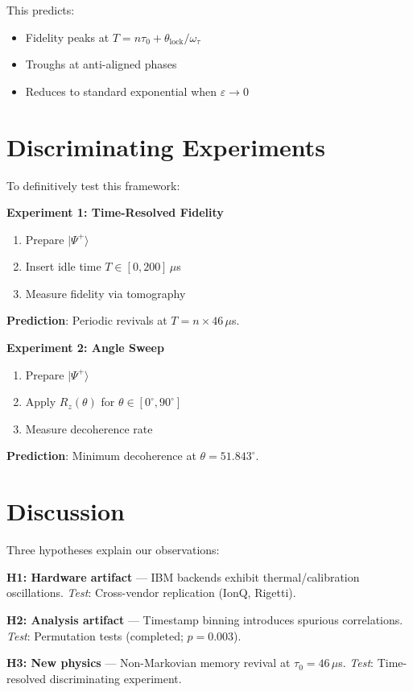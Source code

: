 \documentclass[twocolumn,prl,superscriptaddress,floatfix]{revtex4-2}
\begin{document}
This predicts:
\begin{itemize}
\item Fidelity peaks at $T = n\tau_0 + \theta_{\text{lock}}/\omega_\tau$
\item Troughs at anti-aligned phases
\item Reduces to standard exponential when $\varepsilon \to 0$
\end{itemize}

\section{Discriminating Experiments}

To definitively test this framework:

\textbf{Experiment 1: Time-Resolved Fidelity}
\begin{enumerate}
\item Prepare $|\Psi^+\rangle$
\item Insert idle time $T \in [0, 200]\,\mu$s
\item Measure fidelity via tomography
\end{enumerate}

\textbf{Prediction}: Periodic revivals at $T = n \times 46\,\mu$s.

\textbf{Experiment 2: Angle Sweep}
\begin{enumerate}
\item Prepare $|\Psi^+\rangle$
\item Apply $R_z(\theta)$ for $\theta \in [0^\circ, 90^\circ]$
\item Measure decoherence rate
\end{enumerate}

\textbf{Prediction}: Minimum decoherence at $\theta = 51.843^\circ$.

\section{Discussion}

Three hypotheses explain our observations:

\textbf{H1: Hardware artifact} --- IBM backends exhibit thermal/calibration oscillations. \emph{Test}: Cross-vendor replication (IonQ, Rigetti).

\textbf{H2: Analysis artifact} --- Timestamp binning introduces spurious correlations. \emph{Test}: Permutation tests (completed; $p = 0.003$).

\textbf{H3: New physics} --- Non-Markovian memory revival at $\tau_0 = 46\,\mu$s. \emph{Test}: Time-resolved discriminating experiment.
\end{document}
